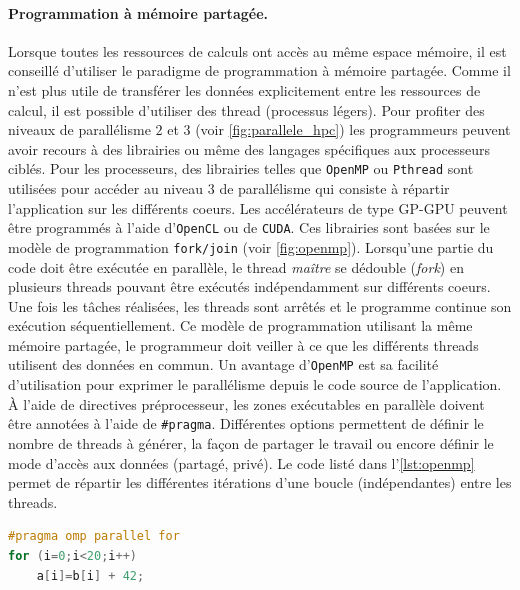         \paragraph{Programmation à mémoire partagée.} \label{sec:prog_partagee}
            
            Lorsque toutes les ressources de calculs ont accès au même espace mémoire, il est conseillé d'utiliser le paradigme de programmation à mémoire partagée. Comme il n'est plus utile de transférer les données explicitement entre les ressources de calcul, il est possible d'utiliser des \gls{thread} (processus légers). Pour profiter des niveaux de parallélisme $2$ et $3$ (voir \autoref{fig:parallele_hpc}) les programmeurs peuvent avoir recours à des librairies ou même des langages spécifiques aux processeurs ciblés. Pour les processeurs, des librairies telles que \verb|OpenMP| ou \verb|Pthread| sont utilisées pour accéder au niveau $3$ de parallélisme qui consiste à répartir l'application sur les différents coeurs. Les accélérateurs de type GP-GPU peuvent être programmés à l'aide d'\verb|OpenCL| ou de \verb|CUDA|. Ces librairies sont basées sur le modèle de programmation \verb|fork/join| (voir \autoref{fig:openmp}). Lorsqu'une partie du code doit être exécutée en parallèle, le thread \textit{maître} se dédouble (\textit{fork}) en plusieurs threads pouvant être exécutés indépendamment sur différents coeurs. Une fois les tâches réalisées, les threads sont arrêtés et le programme continue son exécution séquentiellement. Ce modèle de programmation utilisant la même mémoire partagée, le programmeur doit veiller à ce que les différents threads utilisent des données en commun. Un avantage d'\verb|OpenMP| est sa facilité d'utilisation pour exprimer le parallélisme depuis le code source de l'application. À l'aide de directives préprocesseur, les zones exécutables en parallèle doivent être annotées à l'aide de \verb|#pragma|. Différentes options permettent de définir le nombre de threads à générer, la façon de partager le travail ou encore définir le mode d'accès aux données (partagé, privé). Le code listé dans l'\autoref{lst:openmp} permet de répartir les différentes itérations d'une boucle (indépendantes) entre les threads.
            
\begin{lstlisting}[language=C, caption=Distribution des itérations d'une boucle à l'aide d'OpenMP, label=lst:openmp]
#pragma omp parallel for
for (i=0;i<20;i++)
    a[i]=b[i] + 42;
\end{lstlisting}

